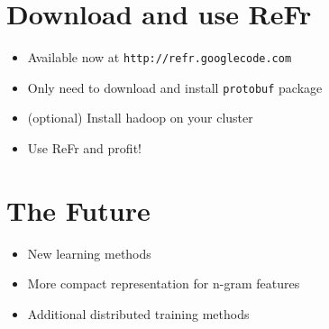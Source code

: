 \documentclass[noback,portrait,twocolumn]{cuposter}
\begin{document}
\section{Download and use ReFr}
\begin{itemize}
\item Available now at \texttt{http://refr.googlecode.com}
\item Only need to download and install \texttt{protobuf} package
\item (optional) Install hadoop on your cluster
\item Use ReFr and profit!
\end{itemize}

\section{The Future}
\begin{itemize}
\item New learning methods
\item More compact representation for n-gram features
\item Additional distributed training methods
\end{itemize}

\small


\end{document}
